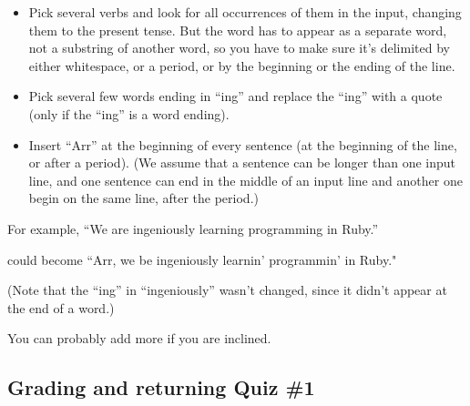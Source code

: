 \documentclass[12pt]{article}
\begin{document}
      \begin{itemize}
  
        \addtolength{\itemsep}{-.5mm}
  
        \item Pick several verbs and look for all occurrences of them in the
              input, changing them to the present tense.  But the word has
              to appear as a separate word, not a substring of another word,
              so you have to make sure it's delimited by either whitespace,
              or a period, or by the beginning or the ending of the line.
  
        \item Pick several few words ending in ``ing'' and replace the
              ``ing'' with a quote (only if the ``ing'' is a word ending).
  
        \item Insert ``Arr'' at the beginning of every sentence (at the
              beginning of the line, or after a period).  (We assume that a
              sentence can be longer than one input line, and one sentence
              can end in the middle of an input line and another one begin
              on the same line, after the period.)
  
      \end{itemize}
  
      \vspace{-1.5mm}
  
      For example, ``We are ingeniously learning programming in Ruby.''
  
      \smallskip
  
      could become ``Arr, we be ingeniously learnin' programmin' in Ruby."
  
      \smallskip
  
        (Note that the ``ing'' in ``ingeniously'' wasn't changed, since it
      didn't appear at the end of a word.)
  
        You can probably add more if you are inclined.
  
    \subsection{Grading and returning Quiz \#1}
  
\end{document}
